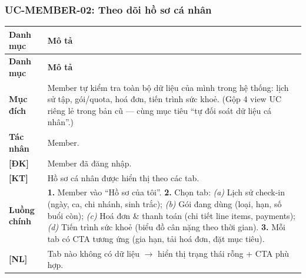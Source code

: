 \subsubsection{UC-MEMBER-02: Theo dõi hồ sơ cá nhân}
\begingroup
\renewcommand{\arraystretch}{1.3}
\begin{longtable}{|>{\centering\arraybackslash}m{3cm}|>{\raggedright\arraybackslash}m{12cm}|}
\hline
\textbf{Danh mục} & \textbf{Mô tả} \\ \hline
\endfirsthead
\hline
\textbf{Danh mục} & \textbf{Mô tả} \\ \hline
\endhead
\hline
\endfoot
\textbf{Mục đích} & Member tự kiểm tra toàn bộ dữ liệu của mình trong hệ thống: lịch sử tập, gói/quota, hoá đơn, tiến trình sức khoẻ. (Gộp 4 view UC riêng lẻ trong bản cũ — cùng mục tiêu ``tự đối soát dữ liệu cá nhân''.) \\
\hline
\textbf{Tác nhân} & Member. \\
\hline
\textbf{[ĐK]} & Member đã đăng nhập. \\
\hline
\textbf{[KT]} & Hồ sơ cá nhân được hiển thị theo các tab. \\
\hline
\textbf{Luồng chính} & \textbf{1.} Member vào ``Hồ sơ của tôi''. \textbf{2.} Chọn tab: \emph{(a)} Lịch sử check-in (ngày, ca, chi nhánh, sinh trắc); \emph{(b)} Gói đang dùng (loại, hạn, số buổi còn); \emph{(c)} Hoá đơn \& thanh toán (chi tiết line items, payments); \emph{(d)} Tiến trình sức khoẻ (biểu đồ cân nặng theo thời gian). \textbf{3.} Mỗi tab có CTA tương ứng (gia hạn, tải hoá đơn, đặt mục tiêu). \\
\hline
\textbf{[NL]} & Tab nào không có dữ liệu $\rightarrow$ hiển thị trạng thái rỗng + CTA phù hợp. \\
\hline
\end{longtable}
\endgroup

